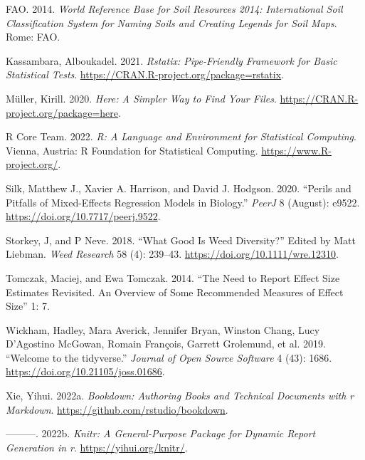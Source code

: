 \documentclass[
]{article}
\newlength{\cslhangindent}
\newlength{\cslentryspacingunit} %
\newenvironment{CSLReferences}[2] %
 {%
  \setlength{\parindent}{0pt}
  \ifodd #1
  \let\oldpar\par
  \def\par{\hangindent=\cslhangindent\oldpar}
  \fi
  \setlength{\parskip}{#2\cslentryspacingunit}
 }%
 {}
\begin{document}
\begin{CSLReferences}{1}{0}
\leavevmode{}%
FAO. 2014. \emph{World Reference Base for Soil Resources 2014: International Soil Classification System for Naming Soils and Creating Legends for Soil Maps}. {Rome}: {FAO}.

\leavevmode{}%
Kassambara, Alboukadel. 2021. \emph{Rstatix: Pipe-Friendly Framework for Basic Statistical Tests}. \url{https://CRAN.R-project.org/package=rstatix}.

\leavevmode{}%
Müller, Kirill. 2020. \emph{Here: A Simpler Way to Find Your Files}. \url{https://CRAN.R-project.org/package=here}.

\leavevmode{}%
R Core Team. 2022. \emph{R: A Language and Environment for Statistical Computing}. Vienna, Austria: R Foundation for Statistical Computing. \url{https://www.R-project.org/}.

\leavevmode{}%
Silk, Matthew J., Xavier A. Harrison, and David J. Hodgson. 2020. {``Perils and Pitfalls of Mixed-Effects Regression Models in Biology.''} \emph{PeerJ} 8 (August): e9522. \url{https://doi.org/10.7717/peerj.9522}.

\leavevmode{}%
Storkey, J, and P Neve. 2018. {``What Good Is Weed Diversity?''} Edited by Matt Liebman. \emph{Weed Research} 58 (4): 239--43. \url{https://doi.org/10.1111/wre.12310}.

\leavevmode{}%
Tomczak, Maciej, and Ewa Tomczak. 2014. {``The Need to Report Effect Size Estimates Revisited. {An} Overview of Some Recommended Measures of Effect Size''} 1: 7.

\leavevmode{}%
Wickham, Hadley, Mara Averick, Jennifer Bryan, Winston Chang, Lucy D'Agostino McGowan, Romain François, Garrett Grolemund, et al. 2019. {``Welcome to the {tidyverse}.''} \emph{Journal of Open Source Software} 4 (43): 1686. \url{https://doi.org/10.21105/joss.01686}.

\leavevmode{}%
Xie, Yihui. 2022a. \emph{Bookdown: Authoring Books and Technical Documents with r Markdown}. \url{https://github.com/rstudio/bookdown}.

\leavevmode{}%
---------. 2022b. \emph{Knitr: A General-Purpose Package for Dynamic Report Generation in r}. \url{https://yihui.org/knitr/}.

\end{CSLReferences}
\end{document}
